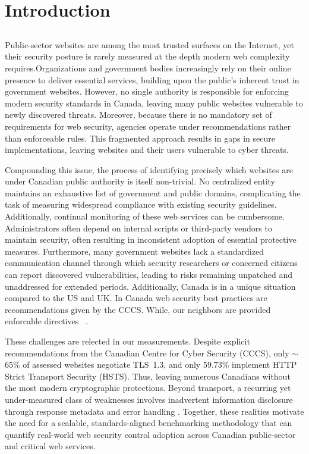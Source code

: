\documentclass[pdflatex,sn-mathphys-num]{sn-jnl}
\numberwithin{equation}{section}
\theoremstyle{thmstyleone}
\theoremstyle{thmstyletwo}%
\theoremstyle{thmstylethree}%
\begin{document}
\section{Introduction}\label{sec:intro}

\subsection{\color{red}{Orientating Paragraph}}

\vspace{1em}
Public-sector websites are among the most trusted surfaces on the Internet, yet their security
posture is rarely measured at the depth modern web complexity requires.Organizations and government
bodies increasingly rely on their online presence to deliver essential services, building upon the
public’s inherent trust in government websites. However, no single authority is responsible for
enforcing modern security standards in Canada, leaving many public websites vulnerable to newly
discovered threats. Moreover, because there is no mandatory set of requirements for web security,
agencies operate under recommendations rather than enforceable rules. This fragmented approach
results in gaps in secure implementations, leaving websites and their users vulnerable to cyber threats.

Compounding this issue, the process of identifying precisely which websites are under Canadian public
authority is itself non-trivial. No centralized entity maintains an exhaustive list of government and
public domains, complicating the task of measuring widespread compliance with existing security
guidelines. Additionally, continual monitoring of these web services can be cumbersome. Administrators
often depend on internal scripts or third-party vendors to maintain security, often resulting in
inconsistent adoption of essential protective measures. Furthermore, many government websites lack a
standardized communication channel through which security researchers or concerned citizens can report
discovered vulnerabilities, leading to risks remaining unpatched and unaddressed for extended periods.
Additionally, Canada is in a unique situation compared to the US and UK. In Canada web security best practices 
are recommendations given by the CCCS. While, our neighbors are provided enforcable directives ~\cite{omb-m-15-13,cisa_bod_18_01}. 

These challenges are relected in our measurements. Despite explicit recommendations from the Canadian Centre for Cyber Security (CCCS),
only $\sim$65\% of assessed websites negotiate TLS~1.3, and only 59.73\% implement HTTP Strict Transport Security (HSTS).
Thus, leaving numerous Canadians without the most modern cryptographic protections. Beyond transport, a recurring yet
under-measured class of weaknesses involves inadvertent information disclosure through response metadata
and error handling \cite{owasp_improper_error_handling,cwe_209,cwe_200}. Together, these realities motivate
the need for a scalable, standards-aligned benchmarking methodology that can quantify real-world web
security control adoption across Canadian public-sector and critical web services.
\end{document}
